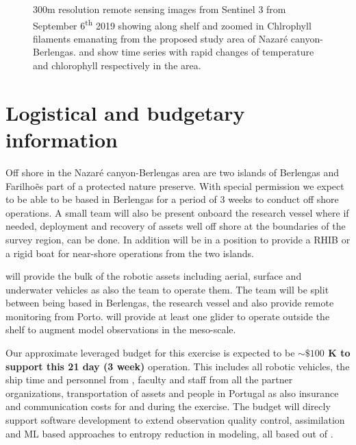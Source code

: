 \begin{figure}[!h]
  \caption{300m resolution remote sensing images from Sentinel 3 from
    September 6\textsuperscript{th} 2019 showing along shelf
     and zoomed in Chlrophyll filaments
     emanating from the proposed study area of
    Nazar\'e canyon-Berlengas.  and
     show time series with rapid changes of
    temperature and chlorophyll respectively in the area.}
  \label{fig:studyarea-2}
\end{figure}

\section*{Logistical and budgetary information}

Off shore in the Nazar\'e canyon-Berlengas area are two islands of
Berlengas and Farilho\~es part of a protected nature preserve. With
special permission we expect to be able to be based in Berlengas for a
period of 3 weeks to conduct off shore operations. A small team will
also be present onboard the \inst research vessel where if needed,
deployment and recovery of assets well off shore at the boundaries of
the survey region, can be done. In addition \inst will be in a
position to provide a RHIB or a rigid boat for near-shore operations
from the two islands.

\univ will provide the bulk of the robotic assets including
aerial, surface and underwater vehicles as also the team to operate
them. The team will be split between being based in Berlengas, the
research vessel and also provide remote monitoring from Porto. \soc
will provide at least one glider to operate outside the shelf to
augment model observations in the meso-scale.

Our approximate leveraged budget for this exercise is expected to be
\textbf{$\sim \$100$ K to support this 21 day (3 week)}
operation. This includes all robotic vehicles, the ship time and
personnel from \inste, faculty and staff from all the partner
organizations, transportation of assets and people in Portugal as also
insurance and communication costs for and during the exercise. The
budget will direcly support software development to extend observation
quality control, assimilation and ML based approaches to entropy
reduction in modeling, all based out of \unive.

